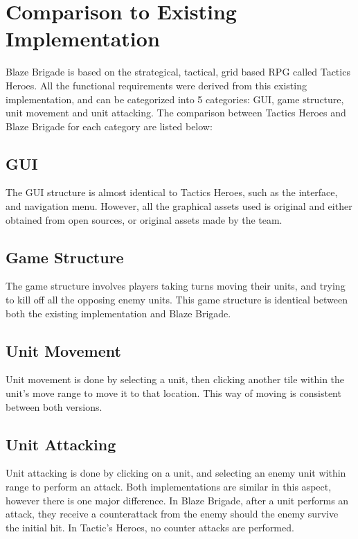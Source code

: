 \documentclass{article}
\begin{document}
\newpage
	
\section{Comparison to Existing Implementation}

Blaze Brigade is based on the strategical, tactical, grid based RPG called Tactics Heroes. All the functional requirements were derived from this existing implementation, and can be categorized into 5 categories: GUI, game structure, unit movement and unit attacking. The comparison between Tactics Heroes and Blaze Brigade for each category are listed below:

\subsection{GUI}
The GUI structure is almost identical to Tactics Heroes, such as the interface, and navigation menu. However, all the graphical assets used is original and either obtained from open sources, or original assets made by the team.

\subsection{Game Structure}
The game structure involves players taking turns moving their units, and trying to kill off all the opposing enemy units. This game structure is identical between both the existing implementation and Blaze Brigade.

\subsection{Unit Movement}
Unit movement is done by selecting a unit, then clicking another tile within the unit's move range to move it to that location. This way of moving is consistent between both versions.

\subsection{Unit Attacking}
Unit attacking is done by clicking on a unit, and selecting an enemy unit within range to perform an attack. Both implementations are similar in this aspect, however there is one major difference. In Blaze Brigade, after a unit performs an attack, they receive a counterattack from the enemy should the enemy survive the initial hit. In Tactic's Heroes, no counter attacks are performed.
\end{document}
